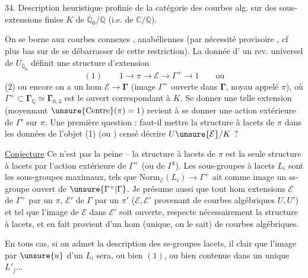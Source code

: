 34. Description heuristique profinie de la catégorie
des courbes alg.  sur  des sous-
extensions finies $K$ de $\overline{\mathbb Q}_0/\mathbb Q$ (i.e. de $\mathbb C/\mathbb Q$).

On se borne aux courbes  connexes , anabéliennes
(par nécessité provisoire \unsure{!}, cf plus bas sur  de
se débarrasser de cette restriction). La donnée d'
un rev. universel de  $U_{\overline{\mathbb Q}_0}$ définit une
structure d'extension
\[
(1)\qquad 1\longrightarrow\pi\longrightarrow\mathcal E\longrightarrow\Gamma^{+}\longrightarrow1\qquad\text{ou}
\]
(2) ou encore on a un hom $\mathcal E\longrightarrow\boldsymbol{\Gamma}$
(image $\Gamma^{+}$ ouverte dans $\boldsymbol{\Gamma}$,
noyau appelé $\pi$),
où $\Gamma^{+}\subset\boldsymbol{\Gamma}_{\mathbb Q}\simeq\boldsymbol{\Gamma}_{0,3}$ est le  ouvert
correspondant à $K$. Se donner une telle
extension (moyennant $\unsure{\mathrm{Centre}}(\pi)=1$) revient à
se donner une action extérieure de $\Gamma'$ sur $\pi$.
Une première question : faut-il mettre la
structure à lacets de $\pi$ dans les  données  de
l'objet (1) (ou ) censé décrire $U\unsure{\mathcal E}/K$ ?

\uline{Conjecture} Ce n'est pas la peine -- la structure à lacets
de $\pi$ est la seule structure à lacets 
par l'action extérieure de $\Gamma^{+}$ (ou de $\Gamma^{\natural}$). Les
sous-groupes à lacets $L_i$ sont les sous-groupes
maximaux, tels que $\mathrm{Norm}_{\mathcal E}(L_i)\longrightarrow\Gamma^{+}$ ait
comme image un ss-groupe ouvert de $\unsure{\Gamma^{+}|\Gamma}$.
Je
présume aussi que tout hom  extensions
$\mathcal E$ de $\Gamma^{+}$ par un $\pi$, $\mathcal E'$ de $\Gamma$ par un $\pi'$
($\mathcal E,\mathcal E'$ provenant de courbes algébriques $U,U'$) et tel
que l'image de $\mathcal E$ dans $\mathcal E'$ soit ouverte, respecte
nécessairement la structure à lacets, et en fait
provient d'un hom (unique, on le sait) de courbes
algébriques.

En tous cas, si on admet la description des
ss-groupes lacets, il  clair que l'image par
$\unsure{u}$ d'un $L_i$ sera, ou bien $(1)$, ou bien contenue
dans un unique $L'_j\ldots$

